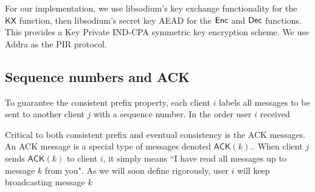 For our implementation, we use libsodium's key exchange functionality for the $\mathsf{KX}$ function, then libsodium's secret key AEAD for the $\mathsf{Enc}$ and $\mathsf{Dec}$ functions. This provides a Key Private IND-CPA symmetric key encryption scheme. We use Addra as the PIR protocol.
\newcommand{\ACK}{\mathsf{ACK}}
\subsection{Sequence numbers and ACK}
To guarantee the consistent prefix property, each client $i$ labels all messages to be sent to another client $j$ with a sequence number. In the order user $i$ received

Critical to both consistent prefix and eventual consistency is the ACK messages. An ACK message is a special type of messages denoted $\ACK(k)$.. When client $j$ sends $\ACK(k)$ to client $i$, it simply means ``I have read all messages up to message $k$ from you". As we will soon define rigorously, user $i$ will keep broadcasting message $k$
